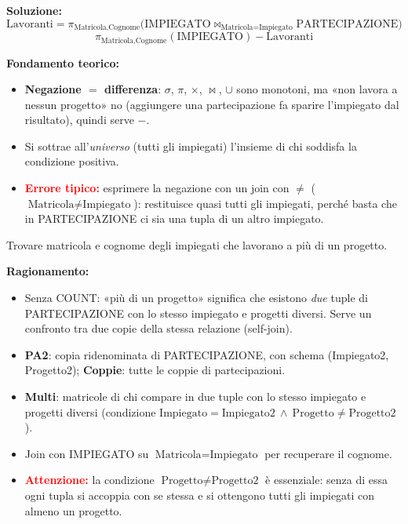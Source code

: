 \documentclass[12pt, a4paper]{article}
\begin{document}
\textbf{Soluzione:}
$$\text{Lavoranti}=\pi_{\text{Matricola},\text{Cognome}}\big(\text{IMPIEGATO}\bowtie_{\text{Matricola}=\text{Impiegato}}\text{PARTECIPAZIONE}\big)$$
$$\pi_{\text{Matricola},\text{Cognome}}(\text{IMPIEGATO})-\text{Lavoranti}$$

\textbf{Fondamento teorico:}
\begin{itemize}
\item \textbf{Negazione $=$ differenza}: $\sigma$, $\pi$, $\times$, $\bowtie$, $\cup$ sono monotoni, ma «non lavora a nessun progetto» no (aggiungere una partecipazione fa sparire l'impiegato dal risultato), quindi serve $-$.
\item Si sottrae all'\emph{universo} (tutti gli impiegati) l'insieme di chi soddisfa la condizione positiva.
\item \textcolor{red}{\textbf{Errore tipico:}} esprimere la negazione con un join con $\neq$ ($\text{Matricola}\neq\text{Impiegato}$): restituisce quasi tutti gli impiegati, perché basta che in PARTECIPAZIONE ci sia una tupla di un altro impiegato.
\end{itemize}

\begin{tcolorbox}[colback=lightergray!10, colframe=tocsec, title=\textbf{Esercizio 1.13}]
Trovare matricola e cognome degli impiegati che lavorano a più di un progetto.
\end{tcolorbox}

\textbf{Ragionamento:}
\begin{itemize}
\item Senza COUNT: «più di un progetto» significa che esistono \emph{due} tuple di PARTECIPAZIONE con lo stesso impiegato e progetti diversi. Serve un confronto tra due copie della stessa relazione (self-join).
\item \textbf{PA2}: copia ridenominata di PARTECIPAZIONE, con schema (Impiegato2, Progetto2); \textbf{Coppie}: tutte le coppie di partecipazioni.
\item \textbf{Multi}: matricole di chi compare in due tuple con lo stesso impiegato e progetti diversi (condizione $\text{Impiegato}=\text{Impiegato2}\ \land\ \text{Progetto}\neq\text{Progetto2}$).
\item Join con IMPIEGATO su $\text{Matricola}=\text{Impiegato}$ per recuperare il cognome.
\item \textcolor{red}{\textbf{Attenzione:}} la condizione $\text{Progetto}\neq\text{Progetto2}$ è essenziale: senza di essa ogni tupla si accoppia con se stessa e si ottengono tutti gli impiegati con almeno un progetto.
\end{itemize}
\end{document}
